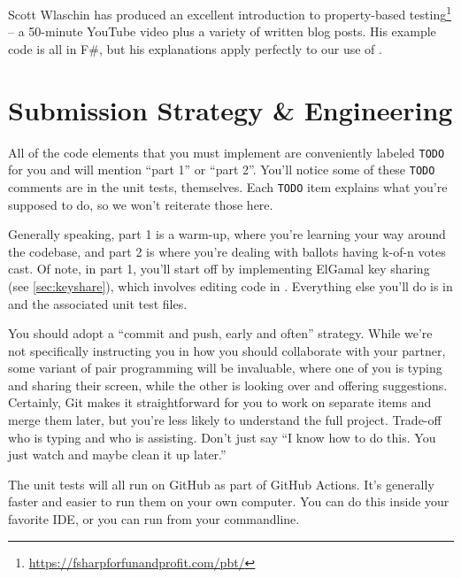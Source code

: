 Scott Wlaschin has produced an excellent introduction to property-based
testing\footnote{\url{https://fsharpforfunandprofit.com/pbt/}} -- a
50-minute YouTube video plus a variety of written blog posts. His
example code is all in F\#, but his explanations apply
perfectly to our use of .

\section{Submission Strategy \& Engineering}

All of the code elements that you must implement are conveniently
labeled {\tt TODO} for you and will mention ``part 1'' or ``part 2''.
You'll notice some of these {\tt TODO} comments are in the unit tests,
themselves. Each {\tt TODO} item explains what you're supposed to do,
so we won't reiterate those here.

Generally speaking, part 1 is a warm-up, where you're learning your
way around the codebase, and part 2 is where you're dealing with
ballots having k-of-n votes cast. Of note, in part 1, you'll start
off by implementing ElGamal key sharing (see \ref{sec:keyshare}),
which involves editing code in .
Everything else you'll do is in 
and the associated unit test files.

You should adopt a ``commit and push, early and often'' strategy.
While we're not specifically instructing you in how you should
collaborate with your partner, some variant of pair programming will
be invaluable, where one of you is typing and sharing their screen,
while the other is looking over and offering suggestions. Certainly,
Git makes it straightforward for you to work on separate items and
merge them later, but you're less likely to understand the full
project. Trade-off who is typing and who is assisting. Don't just say
``I know how to do this. You just watch and maybe clean it up later.''

The unit tests will all run on GitHub as part of GitHub Actions. It's
generally faster and easier to run them on your own computer. You can
do this inside your favorite IDE, or you can run  from
your commandline.

